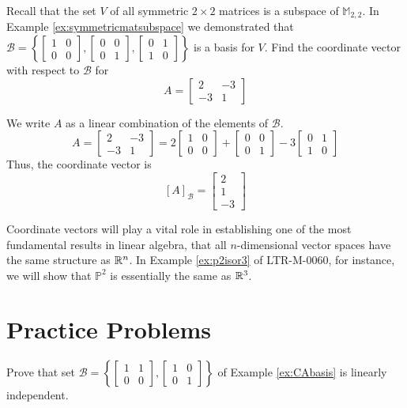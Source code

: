 \documentclass{ximera}
\begin{document}
\begin{example}
Recall that the set $V$ of all symmetric $2\times 2$ matrices is a subspace of $\mathbb{M}_{2,2}$.  In Example \ref{ex:symmetricmatsubspace} we demonstrated that $\mathcal{B} = \left\{
\begin{bmatrix}
1 & 0 \\
0 & 0
\end{bmatrix}, \begin{bmatrix}
0 & 0 \\
0 & 1
\end{bmatrix}, \begin{bmatrix}
0 & 1 \\
1 & 0
\end{bmatrix}
\right\}$ is a basis for $V$.  Find the coordinate vector with respect to $\mathcal{B}$ for 
$$A=\begin{bmatrix}2&-3\\-3&1\end{bmatrix}$$
\begin{explanation}
We write $A$ as a linear combination of the elements of $\mathcal{B}$.
$$A=\begin{bmatrix}2&-3\\-3&1\end{bmatrix}=2\begin{bmatrix}1&0\\0&0\end{bmatrix}+\begin{bmatrix}
0 & 0 \\
0 & 1
\end{bmatrix}-3\begin{bmatrix}
0 & 1 \\
1 & 0
\end{bmatrix}$$
Thus, the coordinate vector is
$$[A]_{\mathcal{B}}=\begin{bmatrix}2\\1\\-3\end{bmatrix}$$
\end{explanation}
\end{example}


Coordinate vectors will play a vital role in establishing one of the most fundamental results in linear algebra, that all $n$-dimensional vector spaces have the same structure as $\mathbb{R}^n$.  In Example \ref{ex:p2isor3} of LTR-M-0060, for instance, we will show that $\mathbb{P}^2$ is essentially the same as $\mathbb{R}^3$.  


\section*{Practice Problems}
\begin{problem}\label{prob:CABlinind}
Prove that set $\mathcal{B}=\left\{\begin{bmatrix}1&1\\0&0\end{bmatrix},\begin{bmatrix}1&0\\0&1\end{bmatrix}\right\}$ of Example \ref{ex:CAbasis} is linearly independent.
\end{problem}
\end{document}
